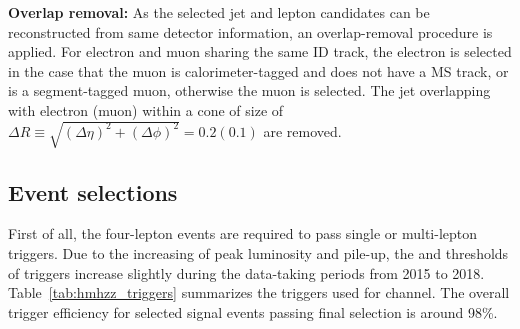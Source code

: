 \textbf{Overlap removal:}
As the selected jet and lepton candidates can be reconstructed from same detector information, an overlap-removal procedure is applied.
For electron and muon sharing the same ID track, the electron is selected in the case that the muon is calorimeter-tagged and does not have a MS track, or is a segment-tagged muon, otherwise the muon is selected.
The jet overlapping with electron (muon) within a cone of size of $\Delta R\equiv \sqrt{(\Delta \eta)^2 + (\Delta \phi)^2}= 0.2 (0.1)$ are removed.


\subsection{Event selections}
\label{sec:hmhzz_eventsel}

First of all, the four-lepton events are required to pass single or multi-lepton triggers.
Due to the increasing of peak luminosity and pile-up, the \pt and \et thresholds of triggers increase slightly during the data-taking periods from 2015 to 2018.
Table~\ref{tab:hmhzz_triggers} summarizes the triggers used for \llll channel. 
The overall trigger efficiency for selected signal events passing final selection is around 98\%.

